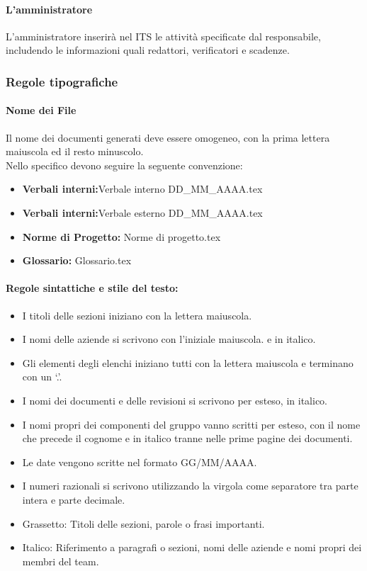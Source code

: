 \documentclass{article}
\begin{document}
    \paragraph{L'amministratore}
    L'amministratore inserirà nel ITS le attività specificate dal responsabile, includendo le informazioni quali redattori, verificatori e scadenze.

    \subsubsection{Regole tipografiche}
    \paragraph{Nome dei File}
    Il nome dei documenti generati deve essere omogeneo, con la prima lettera maiuscola ed il resto minuscolo.\\
    Nello specifico devono seguire la seguente convenzione:
    \begin{itemize}
        \item \textbf{Verbali interni:}Verbale interno DD\_MM\_AAAA.tex
        \item \textbf{Verbali interni:}Verbale esterno DD\_MM\_AAAA.tex
        \item \textbf{Norme di Progetto:} Norme di progetto.tex
        \item \textbf{Glossario:} Glossario.tex
    \end{itemize}
    
    \paragraph{Regole sintattiche e stile del testo:}
    \begin{itemize}
        \item I titoli delle sezioni iniziano con la lettera maiuscola.
        \item I nomi delle aziende si scrivono con l’iniziale maiuscola.
e in italico.
         \item Gli elementi degli elenchi iniziano tutti con la lettera maiuscola e terminano
        con un ‘.’.
        \item I nomi dei documenti e delle revisioni si scrivono per esteso, in italico.
        \item I nomi propri dei componenti del gruppo vanno scritti per esteso, con il nome che
precede il cognome e in italico tranne nelle prime pagine dei documenti.
        \item  Le date vengono scritte nel formato GG/MM/AAAA.
        \item  I numeri razionali si scrivono utilizzando la virgola come separatore tra parte
intera e parte decimale.
\item Grassetto: Titoli delle sezioni, parole o frasi importanti. 
\item Italico: Riferimento a paragrafi o sezioni, nomi delle aziende e nomi propri dei membri del team.
    \end{itemize}
\end{document}
